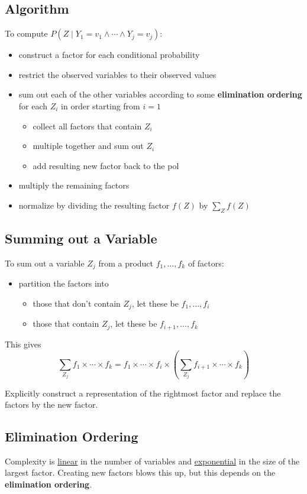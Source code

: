 \documentclass[11pt]{article}
\begin{document}
\subsection{Algorithm}
\label{sec:org8e31e25}
To compute \(P(Z \mid Y_{1} = v_{1} \wedge \cdots \wedge Y_{j} = v_{j})\):
\begin{itemize}
\item construct a factor for each conditional probability
\item restrict the observed variables to their observed values
\item sum out each of the other variables according to some \textbf{elimination ordering} for
each \(Z_{i}\) in order starting from \(i = 1\)
\begin{itemize}
\item collect all factors that contain \(Z_{i}\)
\item multiple together and sum out \(Z_{i}\)
\item add resulting new factor back to the pol
\end{itemize}
\item multiply the remaining factors
\item normalize by dividing the resulting factor \(f(Z)\) by \(\sum_{Z} f(Z)\)
\end{itemize}
\subsection{Summing out a Variable}
\label{sec:org8804133}
To sum out a variable \(Z_{j}\) from a product \(f_{1}, \dots, f_{k}\) of factors:
\begin{itemize}
\item partition the factors into
\begin{itemize}
\item those that don't contain \(Z_{j}\), let these be \(f_{1}, \dots, f_{i}\)
\item those that contain \(Z_{j}\), let these be \(f_{i+1}, \dots, f_{k}\)
\end{itemize}
\end{itemize}

This gives
$$ \sum_{Z_{j}} f_{1} \times \cdots \times f_{k} = f_{1} \times \cdots \times f_{i} \times \left( \sum_{Z_{j}} f_{i+1} \times \cdots \times f_{k} \right) $$

Explicitly construct a representation of the rightmost factor and replace
the factors by the new factor.
\subsection{Elimination Ordering}
\label{sec:org74eafb8}
Complexity is \uline{linear} in the number of variables and \uline{exponential} in the size of the largest
factor.
Creating new factors blows this up, but this depends on the \textbf{elimination ordering}.
\end{document}
